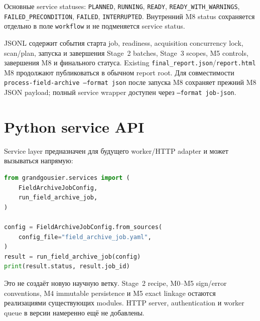 Основные service statuses: \texttt{PLANNED}, \texttt{RUNNING}, \texttt{READY}, \texttt{READY\_WITH\_WARNINGS}, \texttt{FAILED\_PRECONDITION}, \texttt{FAILED}, \texttt{INTERRUPTED}. Внутренний M8 status сохраняется отдельно в поле \texttt{workflow} и не подменяется service status.

JSONL содержит события старта job, readiness, acquisition concurrency lock, scan/plan, запуска и завершения Stage~2 batches, Stage~3 scopes, M5 controls, завершения M8 и финального статуса. Existing \texttt{final\_report.json}/\texttt{report.html} M8 продолжают публиковаться в обычном report root. Для совместимости \texttt{process-field-archive --format json} после запуска M8 сохраняет прежний M8 JSON payload; полный service wrapper доступен через \texttt{--format job-json}.

\section{Python service API}

Service layer предназначен для будущего worker/HTTP adapter и может вызываться напрямую:

\begin{lstlisting}[language=Python]
from grandgousier.services import (
    FieldArchiveJobConfig,
    run_field_archive_job,
)

config = FieldArchiveJobConfig.from_sources(
    config_file="field_archive_job.yaml",
)
result = run_field_archive_job(config)
print(result.status, result.job_id)
\end{lstlisting}

Это не создаёт новую научную ветку. Stage~2 recipe, M0--M5 sign/error conventions, M4 immutable persistence и M5 exact linkage остаются реализациями существующих modules. HTTP server, authentication и worker queue в версии \manualversion{} намеренно ещё не добавлены.
